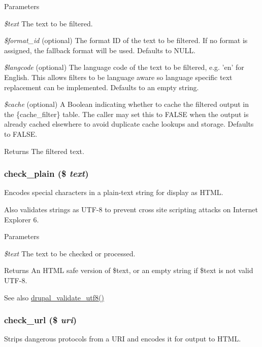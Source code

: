 \begin{DoxyParams}{Parameters}
\item[{\em \$text}]The text to be filtered. \item[{\em \$format\_\-id}](optional) The format ID of the text to be filtered. If no format is assigned, the fallback format will be used. Defaults to NULL. \item[{\em \$langcode}](optional) The language code of the text to be filtered, e.g. 'en' for English. This allows filters to be language aware so language specific text replacement can be implemented. Defaults to an empty string. \item[{\em \$cache}](optional) A Boolean indicating whether to cache the filtered output in the \{cache\_\-filter\} table. The caller may set this to FALSE when the output is already cached elsewhere to avoid duplicate cache lookups and storage. Defaults to FALSE.\end{DoxyParams}
\begin{DoxyReturn}{Returns}
The filtered text. 
\end{DoxyReturn}
\hypertarget{group__sanitization_ga76fc67a30fd8d75ddd80565e6e65a13d}{
\subsubsection[{check\_\-plain}]{\setlength{\rightskip}{0pt plus 5cm}check\_\-plain (\$ {\em text})}}
\label{group__sanitization_ga76fc67a30fd8d75ddd80565e6e65a13d}
Encodes special characters in a plain-\/text string for display as HTML.

Also validates strings as UTF-\/8 to prevent cross site scripting attacks on Internet Explorer 6.


\begin{DoxyParams}{Parameters}
\item[{\em \$text}]The text to be checked or processed.\end{DoxyParams}
\begin{DoxyReturn}{Returns}
An HTML safe version of \$text, or an empty string if \$text is not valid UTF-\/8.
\end{DoxyReturn}
\begin{DoxySeeAlso}{See also}
\hyperlink{bootstrap_8inc_abf62947a33393477301b0070b1ff0c7a}{drupal\_\-validate\_\-utf8()} 
\end{DoxySeeAlso}
\hypertarget{group__sanitization_gac024315b69035ef05c33674838707919}{
\subsubsection[{check\_\-url}]{\setlength{\rightskip}{0pt plus 5cm}check\_\-url (\$ {\em uri})}}
\label{group__sanitization_gac024315b69035ef05c33674838707919}
Strips dangerous protocols from a URI and encodes it for output to HTML.


